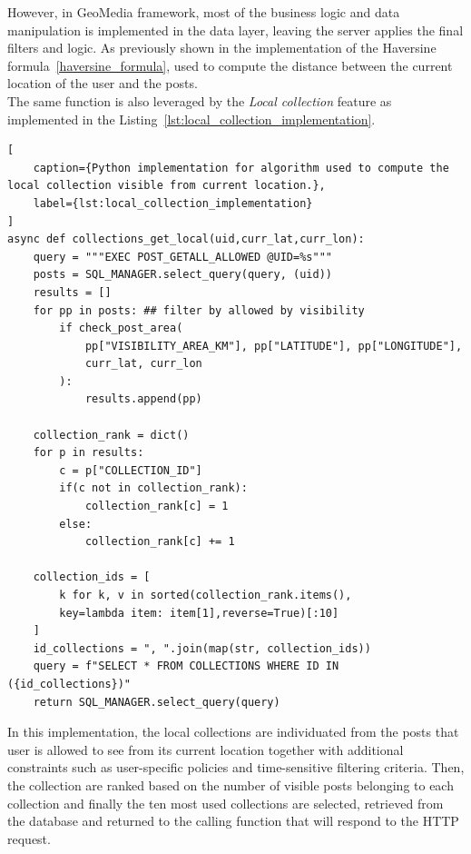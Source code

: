 However, in GeoMedia framework, most of the business logic and data manipulation is implemented in the data layer, leaving the server applies the final filters and logic. As previously shown in the implementation of the Haversine formula~\ref{haversine_formula}, used to compute the distance between the current location of the user and the posts.\\
The same function is also leveraged by the \textit{Local collection} feature as implemented in the Listing~\ref{lst:local_collection_implementation}.


\begin{lstlisting}[
    caption={Python implementation for algorithm used to compute the local collection visible from current location.},
    label={lst:local_collection_implementation}
]
async def collections_get_local(uid,curr_lat,curr_lon):
    query = """EXEC POST_GETALL_ALLOWED @UID=%s"""
    posts = SQL_MANAGER.select_query(query, (uid))
    results = []
    for pp in posts: ## filter by allowed by visibility
        if check_post_area(
            pp["VISIBILITY_AREA_KM"], pp["LATITUDE"], pp["LONGITUDE"], 
            curr_lat, curr_lon
        ):
            results.append(pp)

    collection_rank = dict()
    for p in results:
        c = p["COLLECTION_ID"]
        if(c not in collection_rank):
            collection_rank[c] = 1
        else:
            collection_rank[c] += 1

    collection_ids = [
        k for k, v in sorted(collection_rank.items(),
        key=lambda item: item[1],reverse=True)[:10]
    ]
    id_collections = ", ".join(map(str, collection_ids))
    query = f"SELECT * FROM COLLECTIONS WHERE ID IN ({id_collections})"
    return SQL_MANAGER.select_query(query)
\end{lstlisting}

In this implementation, the local collections are individuated from the posts that user is allowed to see from its current location together with additional constraints such as user-specific policies and time-sensitive filtering criteria. Then, the collection are ranked based on the number of visible posts belonging to each collection and finally the ten most used collections are selected, retrieved from the database and returned to the calling function that will respond to the HTTP request.

